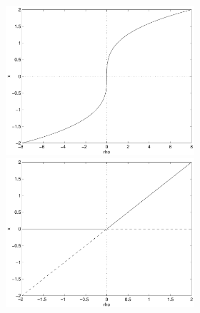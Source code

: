 \documentclass{ximera}
\begin{document}
\begin{exercise}
\begin{solution}
\begin{figure}[htb]
                       \centerline{%
                       \includegraphics[width=2.75in]{exfigure/9-3-1a.pdf}
                       \includegraphics[width=2.75in]{exfigure/9-3-1b.pdf}}
\end{figure}

\end{solution}
\end{exercise}
\end{document}
